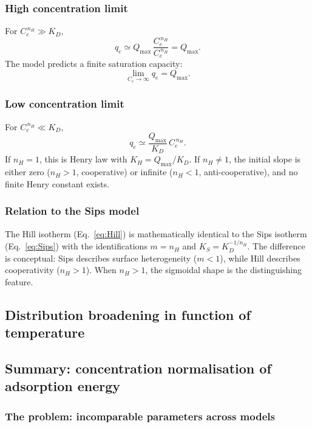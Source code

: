 \documentclass[12pt]{article}
\begin{document}
	\subsubsection{High concentration limit}

	For $C_e^{\,n_H} \gg K_D$,
	\begin{equation}
		q_e \simeq Q_{\max}\,\frac{C_e^{\,n_H}}{C_e^{\,n_H}} = Q_{\max}.
	\end{equation}
	The model predicts a finite saturation capacity:
	\begin{equation}
		\boxed{\lim_{C_e \to \infty} q_e = Q_{\max}.}
	\end{equation}

	\subsubsection{Low concentration limit}

	For $C_e^{\,n_H} \ll K_D$,
	\begin{equation}
		q_e \simeq \frac{Q_{\max}}{K_D}\, C_e^{\,n_H}.
	\end{equation}
	If $n_H = 1$, this is Henry law with $K_H = Q_{\max}/K_D$.
	If $n_H \neq 1$, the initial slope is either zero ($n_H > 1$,
	cooperative) or infinite ($n_H < 1$, anti-cooperative), and no
	finite Henry constant exists.

	\subsubsection{Relation to the Sips model}

	The Hill isotherm (Eq.~\eqref{eq:Hill}) is mathematically
	identical to the Sips isotherm (Eq.~\eqref{eq:Sips}) with the
	identifications $m = n_H$ and $K_S = K_D^{-1/n_H}$. The
	difference is conceptual: Sips describes surface heterogeneity
	($m < 1$), while Hill describes cooperativity ($n_H > 1$).
	When $n_H > 1$, the sigmoidal shape is the distinguishing
	feature.

	\subsection{Distribution broadening in function of temperature}

	\subsection{Summary: concentration normalisation of adsorption energy}

	\subsubsection{The problem: incomparable parameters across models}
\end{document}
